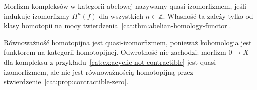 \begin{definicja}\label{cat:def:quasi-isomorphism}
Morfizm kompleksów w kategorii abelowej nazywamy quasi-izomorfizmem, jeśli indukuje izomorfizmy $H^n(f)$ dla wszystkich $n\in\mathbb Z$. Własność ta zależy tylko od klasy homotopii na mocy twierdzenia~\ref{cat:thm:abelian-homology-functor}.
\end{definicja}
\begin{uwaga}
Równoważność homotopijna jest quasi-izomorfizmem, ponieważ kohomologia jest funktorem na kategorii homotopijnej. Odwrotność nie zachodzi: morfizm $0\to X$ dla kompleksu z przykładu~\ref{cat:ex:acyclic-not-contractible} jest quasi-izomorfizmem, ale nie jest równoważnością homotopijną przez stwierdzenie~\ref{cat:prop:contractible-zero}.
\end{uwaga}


